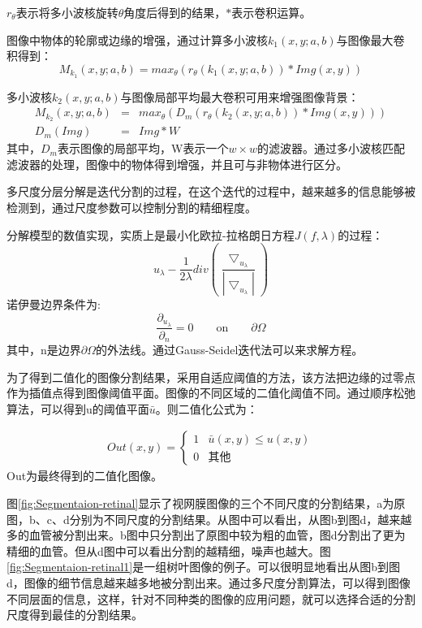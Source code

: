 $r_\theta$表示将多小波核旋转$\theta$角度后得到的结果，$\ast$表示卷积运算。

图像中物体的轮廓或边缘的增强，通过计算多小波核$k_1(x,y;a,b)$与图像最大卷积得到：
\begin{equation}
M_{k_1}(x,y;a,b) = max_\theta(r_\theta(k_1(x,y;a,b)) \ast Img(x,y))
\end{equation} 

多小波核$k_2(x,y;a,b)$与图像局部平均最大卷积可用来增强图像背景：
\begin{eqnarray}
M_{k_2}(x,y;a,b) &=& max_\theta(D_m(r_\theta(k_2(x,y;a,b)) \ast Img(x,y)))\\
D_m(Img) &=& Img\ast W
\end{eqnarray} 
其中，$D_m$表示图像的局部平均，W表示一个$w \times w$的滤波器。通过多小波核匹配滤波器的处理，图像中的物体得到增强，并且可与非物体进行区分。

多尺度分层分解是迭代分割的过程，在这个迭代的过程中，越来越多的信息能够被检测到，通过尺度参数可以控制分割的精细程度。

分解模型的数值实现，实质上是最小化欧拉-拉格朗日方程$J(f,\lambda)$的过程：
\begin{equation}
u_\lambda - \frac{1}{2\lambda}div(\frac{\bigtriangledown_{u_\lambda}}{|\bigtriangledown_{u_\lambda}|})
\end{equation}
诺伊曼边界条件为:
\begin{equation}
\frac{\partial_{u_\lambda}}{\partial_n} = 0 \qquad \textrm{on} \qquad \partial \Omega
\end{equation}
其中，n是边界$\partial \Omega$的外法线。通过Gauss-Seidel迭代法\cite{tadmor,nezzar}可以来求解方程。

为了得到二值化的图像分割结果，采用自适应阈值的方法，该方法把边缘的过零点作为插值点得到图像阈值平面。图像的不同区域的二值化阈值不同。通过顺序松弛算法，可以得到u的阈值平面$\bar{u}$。则二值化公式为：

\begin{align}
Out(x,y) = \left\{ \begin{array}{ll}
1 & \bar{u}(x,y)\leq u(x,y)\\
0 & \textrm{其他}
\end{array} \right.
\end{align}
Out为最终得到的二值化图像。

图\ref{fig:Segmentaion-retinal}显示了视网膜图像的三个不同尺度的分割结果，a为原图，b、c、d分别为不同尺度的分割结果。从图中可以看出，从图b到图d，越来越多的血管被分割出来。b图中只分割出了原图中较为粗的血管，图d分割出了更为精细的血管。但从d图中可以看出分割的越精细，噪声也越大。图\ref{fig:Segmentaion-retinal1}是一组树叶图像的例子。可以很明显地看出从图b到图d，图像的细节信息越来越多地被分割出来。通过多尺度分割算法，可以得到图像不同层面的信息，这样，针对不同种类的图像的应用问题，就可以选择合适的分割尺度得到最佳的分割结果。

